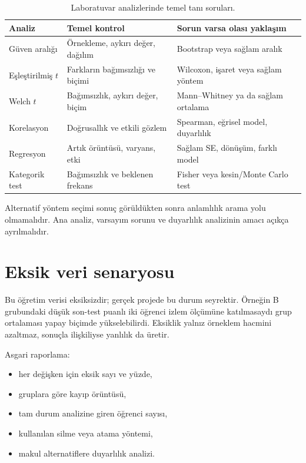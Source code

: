 \begin{table}[htbp]
\centering
\caption{Laboratuvar analizlerinde temel tanı soruları.}
\begingroup\scriptsize
\begin{tabular}{@{}p{}p{}p{}@{}}
\toprule
Analiz & Temel kontrol & Sorun varsa olası yaklaşım \\
\midrule
Güven aralığı & Örnekleme, aykırı değer, dağılım & Bootstrap veya sağlam aralık \\
Eşleştirilmiş $t$ & Farkların bağımsızlığı ve biçimi & Wilcoxon, işaret veya sağlam yöntem \\
Welch $t$ & Bağımsızlık, aykırı değer, biçim & Mann--Whitney ya da sağlam ortalama \\
Korelasyon & Doğrusallık ve etkili gözlem & Spearman, eğrisel model, duyarlılık \\
Regresyon & Artık örüntüsü, varyans, etki & Sağlam SE, dönüşüm, farklı model \\
Kategorik test & Bağımsızlık ve beklenen frekans & Fisher veya kesin/Monte Carlo test \\
\bottomrule
\end{tabular}
\endgroup
\end{table}

Alternatif yöntem seçimi sonuç görüldükten sonra anlamlılık arama yolu
olmamalıdır. Ana analiz, varsayım sorunu ve duyarlılık analizinin amacı açıkça
ayrılmalıdır.

\section{Eksik veri senaryosu}

Bu öğretim verisi eksiksizdir; gerçek projede bu durum seyrektir. Örneğin B
grubundaki düşük son-test puanlı iki öğrenci izlem ölçümüne katılmasaydı grup
ortalaması yapay biçimde yükselebilirdi. Eksiklik yalnız örneklem hacmini
azaltmaz, sonuçla ilişkiliyse yanlılık da üretir.

Asgari raporlama:

\begin{itemize}
  \item her değişken için eksik sayı ve yüzde,
  \item gruplara göre kayıp örüntüsü,
  \item tam durum analizine giren öğrenci sayısı,
  \item kullanılan silme veya atama yöntemi,
  \item makul alternatiflere duyarlılık analizi.
\end{itemize}

